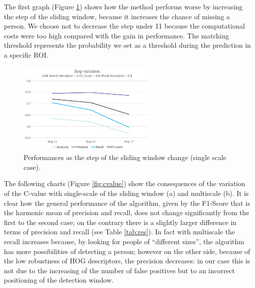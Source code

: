 \documentclass[a4paper, 10pt, onecolumn]{article} %
\begin{document}
The first graph (Figure \ref{fig:step}) shows how the method performs worse by increasing the step of the sliding window, because it increases the chance of missing a person. We choose not to decrease the step under 11 because the computational costs were too high compared with the gain in performance.  The matching threshold represents the probability we set as a threshold during the prediction in a specific ROI.
\begin{figure}[h!]
\centering
\includegraphics[height=4.5cm]{step_variation.png} 
\caption{Performances as the step of the sliding window change (single scale case).}
\label{fig:step}
\end{figure}

The following charts (Figure \ref{fig:cvalue}) show the consequences of the variation of the C-value with single-scale of the sliding window (a) and multiscale (b).  It is clear how the general performance of the algorithm, given by the F1-Score that is the harmonic mean of precision and recall, does not change significantly from the first to the second case; on the contrary there is a slightly larger difference in terms of precision and recall (see Table \ref{tab:res}). In fact with multiscale the recall increases because, by looking for people of ``different sizes'', the algorithm has more possibilities of detecting a person; however on the other side, because of the low robustness of HOG descriptors,  the precision decreases: in our case this is not due to the increasing of the number of false positives but to an incorrect positioning of the detection window. 
\end{document}
